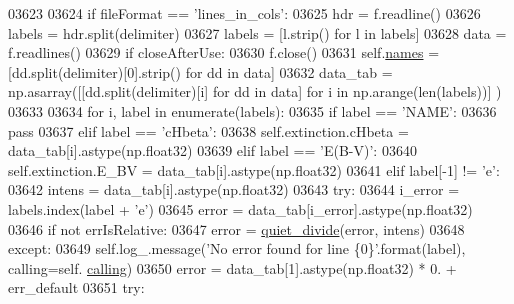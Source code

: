 \begin{DoxyCode}
{{{{{{{{{{{{{{{{{{{{{{03623             
03624         \textcolor{keywordflow}{if} fileFormat == \textcolor{stringliteral}{'lines\_in\_cols'}:
03625             hdr = f.readline()
03626             labels = hdr.split(delimiter)
03627             labels = [l.strip() \textcolor{keywordflow}{for} l \textcolor{keywordflow}{in} labels]
03628             data = f.readlines()
03629             \textcolor{keywordflow}{if} closeAfterUse:
03630                 f.close()
03631             self.\hyperlink{classpyneb_1_1core_1_1pynebcore_1_1_observation_a3f365d0b1488b2eba300bf71caf23c17}{names} = [dd.split(delimiter)[0].strip() \textcolor{keywordflow}{for} dd \textcolor{keywordflow}{in} data]
03632             data\_tab = np.asarray([[dd.split(delimiter)[i] \textcolor{keywordflow}{for} dd \textcolor{keywordflow}{in} data] \textcolor{keywordflow}{for} i \textcolor{keywordflow}{in} np.arange(len(labels))]
      )
03633             
03634             \textcolor{keywordflow}{for} i, label \textcolor{keywordflow}{in} enumerate(labels):
03635                 \textcolor{keywordflow}{if} label == \textcolor{stringliteral}{'NAME'}:
03636                     \textcolor{keywordflow}{pass}
03637                 \textcolor{keywordflow}{elif} label == \textcolor{stringliteral}{'cHbeta'}:
03638                     self.extinction.cHbeta = data\_tab[i].astype(np.float32)
03639                 \textcolor{keywordflow}{elif} label == \textcolor{stringliteral}{'E(B-V)'}:
03640                     self.extinction.E\_BV = data\_tab[i].astype(np.float32)         
03641                 \textcolor{keywordflow}{elif} label[-1] != \textcolor{stringliteral}{'e'}:
03642                     intens = data\_tab[i].astype(np.float32)
03643                     \textcolor{keywordflow}{try}:
03644                         i\_error = labels.index(label + \textcolor{stringliteral}{'e'})
03645                         error = data\_tab[i\_error].astype(np.float32)
03646                         \textcolor{keywordflow}{if} \textcolor{keywordflow}{not} errIsRelative:
03647                             error = \hyperlink{namespacepyneb_1_1utils_1_1misc_afa4163f24be7b1472200c24824c72ae1}{quiet\_divide}(error, intens)
03648                     \textcolor{keywordflow}{except}:
03649                         self.log\_.message(\textcolor{stringliteral}{'No error found for line \{0\}'}.format(label), calling=self.
      \hyperlink{classpyneb_1_1core_1_1pynebcore_1_1_observation_a2639fad9af4fefad20e4097295bd40e7}{calling})
03650                         error = data\_tab[1].astype(np.float32) * 0. + err\_default
03651                     \textcolor{keywordflow}{try}:
}}}}}}}}}}}}}}}}}}}}}}
\end{DoxyCode}
